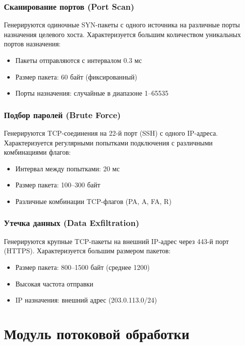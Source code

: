 \subsubsection{Сканирование портов (Port Scan)}

Генерируются одиночные SYN-пакеты с одного источника на различные порты назначения целевого хоста. Характеризуется большим количеством уникальных портов назначения:

\begin{itemize}
    \item Пакеты отправляются с интервалом 0.3 мс
    \item Размер пакета: 60 байт (фиксированный)
    \item Порты назначения: случайные в диапазоне 1--65535
\end{itemize}

\subsubsection{Подбор паролей (Brute Force)}

Генерируются TCP-соединения на 22-й порт (SSH) с одного IP-адреса. Характеризуется регулярными попытками подключения с различными комбинациями флагов:

\begin{itemize}
    \item Интервал между попытками: 20 мс
    \item Размер пакета: 100--300 байт
    \item Различные комбинации TCP-флагов (PA, A, FA, R)
\end{itemize}

\subsubsection{Утечка данных (Data Exfiltration)}

Генерируются крупные TCP-пакеты на внешний IP-адрес через 443-й порт (HTTPS). Характеризуется большим размером пакетов:

\begin{itemize}
    \item Размер пакета: 800--1500 байт (среднее 1200)
    \item Высокая частота отправки
    \item IP назначения: внешний адрес (203.0.113.0/24)
\end{itemize}

\section{Модуль потоковой обработки}

